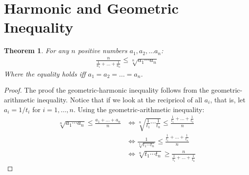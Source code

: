 \documentclass[12pt]{extreport}
\newtheorem*{thm}{Theorem}
\begin{document}
\section*{Harmonic and Geometric Inequality}
\begin{thm}
For any $n$ positive numbers $a_1, a_2, ... a_n$: 
\begin{align*}
\frac{n}{\frac{1}{a_1} + \ldots + \frac{1}{a_n}} \leq \sqrt[n]{a_1 \cdots a_n}
\end{align*}
Where the equality holds iff $a_1 = a_2 = ... = a_n$.
\end{thm}

\begin{proof}
The proof the geometric-harmonic inequality follows from the geometric-arithmetic inequality. Notice that if we look at the recipricol of all $a_i$, that is, let $a_i = 1/t_i$ for $i = 1, \ldots, n$. Using the geometric-arithmetic inequality:
\begin{align*}
\sqrt[n]{a_1 \cdots a_n} \leq \frac{a_1 + \ldots + a_n}{n} &\iff
\sqrt[n]{\frac{1}{t_1} \cdots \frac{1}{t_n}} \leq \frac{\frac{1}{t_1} + \ldots + \frac{1}{t_n}}{n} \\&\iff 
\frac{1}{\sqrt[n]{t_1\cdots t_n}} \leq \frac{\frac{1}{t_1} + \ldots + \frac{1}{t_n}}{n} \\&\iff
\sqrt[n]{t_1 \cdots t_n} \geq \frac{n}{\frac{1}{t_1} + \ldots + \frac{1}{t_n}}
\end{align*}
\end{proof}
\end{document}
